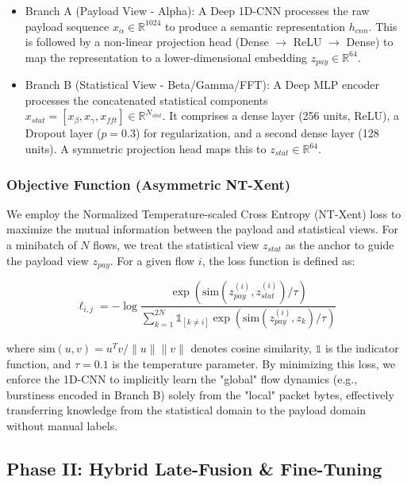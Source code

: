 \begin{itemize}
    \item Branch A (Payload View - Alpha): A Deep 1D-CNN processes the raw payload sequence $x_{\alpha} \in \mathbb{R}^{1024}$ to produce a semantic representation $h_{cnn}$. This is followed by a non-linear projection head (Dense $\rightarrow$ ReLU $\rightarrow$ Dense) to map the representation to a lower-dimensional embedding $z_{pay} \in \mathbb{R}^{64}$.
    
    \item Branch B (Statistical View - Beta/Gamma/FFT): A Deep MLP encoder processes the concatenated statistical components $x_{stat} = [x_{\beta}, x_{\gamma}, x_{fft}] \in \mathbb{R}^{N_{stat}}$. It comprises a dense layer (256 units, ReLU), a Dropout layer ($p=0.3$) for regularization, and a second dense layer (128 units). A symmetric projection head maps this to $z_{stat} \in \mathbb{R}^{64}$.
\end{itemize}

\subsubsection{Objective Function (Asymmetric NT-Xent)}
We employ the Normalized Temperature-scaled Cross Entropy (NT-Xent) loss to maximize the mutual information between the payload and statistical views. For a minibatch of $N$ flows, we treat the statistical view $z_{stat}$ as the anchor to guide the payload view $z_{pay}$. For a given flow $i$, the loss function is defined as:

\begin{equation}
    \ell_{i,j} = -\log \frac{\exp(\text{sim}(z_{pay}^{(i)}, z_{stat}^{(i)}) / \tau)}{\sum_{k=1}^{2N} \mathbb{1}_{[k \neq i]} \exp(\text{sim}(z_{pay}^{(i)}, z_{k}) / \tau)}
\end{equation}

where $\text{sim}(u, v) = u^T v / \|u\| \|v\|$ denotes cosine similarity, $\mathbb{1}$ is the indicator function, and $\tau=0.1$ is the temperature parameter. By minimizing this loss, we enforce the 1D-CNN to implicitly learn the "global" flow dynamics (e.g., burstiness encoded in Branch B) solely from the "local" packet bytes, effectively transferring knowledge from the statistical domain to the payload domain without manual labels.

\subsection{Phase II: Hybrid Late-Fusion \& Fine-Tuning}
\label{subsec:phase2_finetuning}

